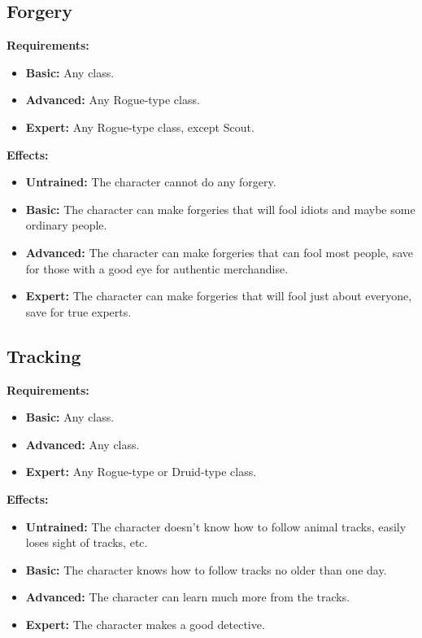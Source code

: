 \documentclass[openany,10pt,a4paper]{book}
\begin{document}
\subsection{Forgery}
\begin{table}[!ht]
\centering
{}
\end{table}
\textbf{Requirements:}
\begin{itemize}
	\item \textbf{Basic:} Any class.
	\item \textbf{Advanced:} Any Rogue-type class.
	\item \textbf{Expert:} Any Rogue-type class, except Scout.
\end{itemize}
\textbf{Effects:}
\begin{itemize}
	\item \textbf{Untrained:} The character cannot do any forgery.
	\item \textbf{Basic:} The character can make forgeries that will fool idiots and maybe some ordinary people.
	\item \textbf{Advanced:} The character can make forgeries that can fool most people, save for those with a good eye for authentic merchandise.
	\item \textbf{Expert:} The character can make forgeries that will fool just about everyone, save for true experts.
\end{itemize}\newpage
\subsection{Tracking}
\begin{table}[!ht]
\centering
{}
\end{table}
\textbf{Requirements:}
\begin{itemize}
	\item \textbf{Basic:} Any class.
	\item \textbf{Advanced:} Any class.
	\item \textbf{Expert:} Any Rogue-type or Druid-type class.
\end{itemize}
\textbf{Effects:}
\begin{itemize}
	\item \textbf{Untrained:} The character doesn't know how to follow animal tracks, easily loses sight of tracks, etc.
	\item \textbf{Basic:} The character knows how to follow tracks no older than one day.
	\item \textbf{Advanced:} The character can learn much more from the tracks.
	\item \textbf{Expert:} The character makes a good detective.
\end{itemize}\newpage
\end{document}
